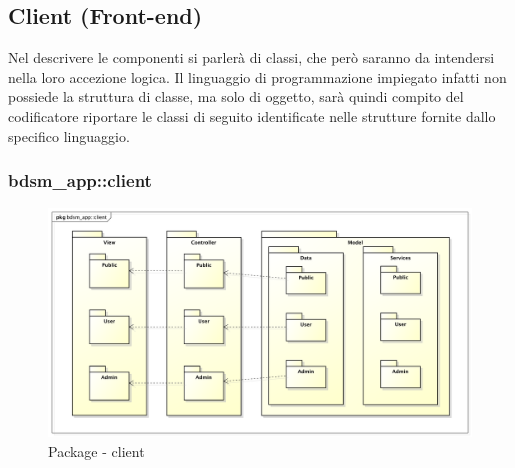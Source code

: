 %


\subsection{Client (Front-end)} %
\label{sub:client}
Nel descrivere le componenti si parlerà di classi, che però saranno da intendersi nella loro accezione logica. Il linguaggio di programmazione impiegato infatti non possiede la struttura di classe, ma solo di oggetto, sarà quindi compito del codificatore riportare le classi di seguito identificate nelle strutture fornite dallo specifico linguaggio.

	\subsubsection{bdsm\_app::client} %
	\label{ssub:bdsm_app_client}
	\begin{figure}[htbp]
		\centering
		\centerline{\includegraphics[scale=0.4]{./images/client.pdf}}
		\caption{Package - client}
	\end{figure}
	
